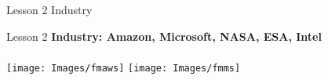\documentclass[aspectratio=1610]{beamer}
\begin{document}
\begin{frame}{Lesson 2}{}
	\Huge Industry
\end{frame}


\begin{frame}
\end{frame}

\begin{frame}{Lesson 2}{}
\LARGE
\textbf{Industry: Amazon, Microsoft, NASA, ESA, Intel}\\~\\
\texttt{[image: Images/fmaws]}
\texttt{[image: Images/fmms]}
\end{frame}





\end{document}
